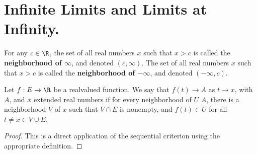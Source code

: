 
\section{Infinite Limits and Limits at Infinity.}

\begin{definition}
    For any $c \in \R$, the set of all real numbers $x$ such that  $x>c$ is called the 
    \textbf{neighborhood of $\infty$}, and denoted $(c,\infty)$. The set of all real 
    numbers $x$ such that  $x>c$ is called the \textbf{neighborhood of $-\infty$}, and 
    denoted $(-\infty,c)$. 
\end{definition}

\begin{definition}
    Let $f:E \rightarrow \R$ be a realvalued function. We say that  $f(t) \rightarrow A$ as $t \rightarrow x$, with 
     $A$, and $x$ extended real numbers if for every neighborhood of $U$ $A$, there is a 
     neighborhood $V$ of $x$ such that $V \cap E$ is nonempty, and $f(t) \in U$ for 
     all $t \neq x \in V \cup E$.
\end{definition}

\begin{proof}
    This is a direct application of the sequential criterion using the appropriate definition.		
\end{proof}
